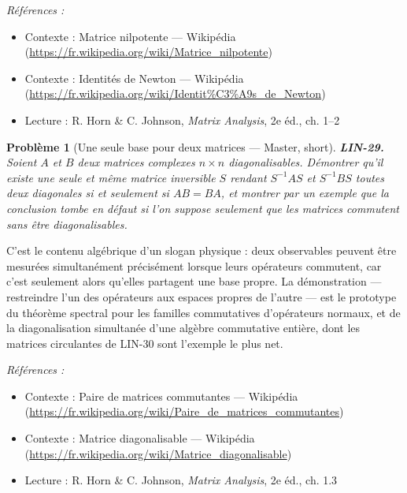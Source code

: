 \documentclass[11pt]{article}
\newtheorem{problem}{Problème}
\newenvironment{refs}{\par\small\noindent\emph{Références :}\begin{itemize}\setlength\itemsep{0pt}}{\end{itemize}\normalsize}
\begin{document}
\begin{refs}
\item Contexte : Matrice nilpotente --- Wikipédia (\url{https://fr.wikipedia.org/wiki/Matrice_nilpotente})
\item Contexte : Identités de Newton --- Wikipédia (\url{https://fr.wikipedia.org/wiki/Identit%C3%A9s_de_Newton})
\item Lecture : R. Horn \& C. Johnson, \textit{Matrix Analysis}, 2e éd., ch. 1--2
\end{refs}

\bigskip

\begin{problem}[{Une seule base pour deux matrices --- Master, short}]
\textbf{LIN-29.} Soient $A$ et $B$ deux matrices complexes $n \times n$
diagonalisables. Démontrer qu'il existe une seule et même matrice inversible $S$ rendant
$S^{-1} A S$ et $S^{-1} B S$ toutes deux diagonales si et seulement si $AB = BA$, et montrer par un exemple que la
conclusion tombe en défaut si l'on suppose seulement que les matrices commutent sans être
diagonalisables.
\end{problem}

\noindent C'est le contenu algébrique d'un slogan physique : deux observables peuvent être
mesurées simultanément précisément lorsque leurs opérateurs commutent, car c'est seulement alors
qu'elles partagent une base propre. La démonstration --- restreindre l'un des opérateurs aux espaces
propres de l'autre --- est le prototype du théorème spectral pour les familles commutatives d'opérateurs
normaux, et de la diagonalisation simultanée d'une algèbre commutative entière, dont les matrices
circulantes de LIN-30 sont l'exemple le plus net.

\begin{refs}
\item Contexte : Paire de matrices commutantes --- Wikipédia (\url{https://fr.wikipedia.org/wiki/Paire_de_matrices_commutantes})
\item Contexte : Matrice diagonalisable --- Wikipédia (\url{https://fr.wikipedia.org/wiki/Matrice_diagonalisable})
\item Lecture : R. Horn \& C. Johnson, \textit{Matrix Analysis}, 2e éd., ch. 1.3
\end{refs}

\bigskip
\end{document}
